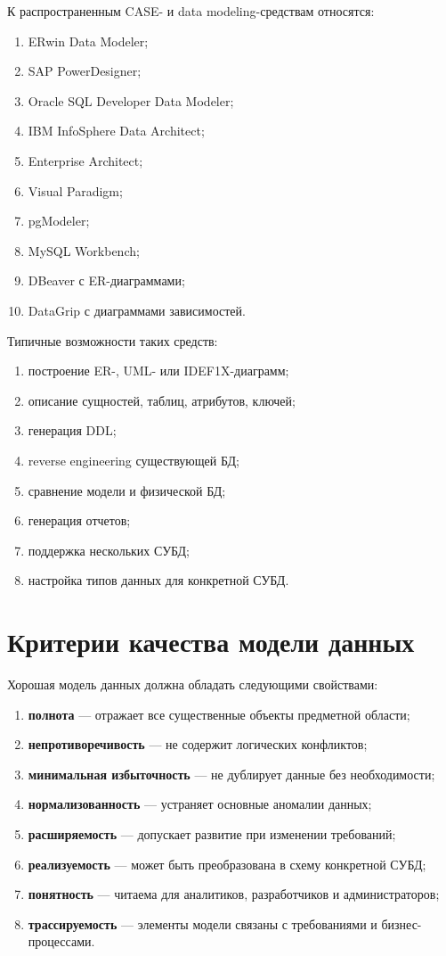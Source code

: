 \documentclass[12pt,a4paper]{article}
\theoremstyle{remark}
\begin{document}
К распространенным CASE- и data modeling-средствам относятся:

\begin{enumerate}
    \item ERwin Data Modeler;
    \item SAP PowerDesigner;
    \item Oracle SQL Developer Data Modeler;
    \item IBM InfoSphere Data Architect;
    \item Enterprise Architect;
    \item Visual Paradigm;
    \item pgModeler;
    \item MySQL Workbench;
    \item DBeaver с ER-диаграммами;
    \item DataGrip с диаграммами зависимостей.
\end{enumerate}

Типичные возможности таких средств:

\begin{enumerate}
    \item построение ER-, UML- или IDEF1X-диаграмм;
    \item описание сущностей, таблиц, атрибутов, ключей;
    \item генерация DDL;
    \item reverse engineering существующей БД;
    \item сравнение модели и физической БД;
    \item генерация отчетов;
    \item поддержка нескольких СУБД;
    \item настройка типов данных для конкретной СУБД.
\end{enumerate}

\section{Критерии качества модели данных}

Хорошая модель данных должна обладать следующими свойствами:

\begin{enumerate}
    \item \textbf{полнота} --- отражает все существенные объекты предметной области;
    \item \textbf{непротиворечивость} --- не содержит логических конфликтов;
    \item \textbf{минимальная избыточность} --- не дублирует данные без необходимости;
    \item \textbf{нормализованность} --- устраняет основные аномалии данных;
    \item \textbf{расширяемость} --- допускает развитие при изменении требований;
    \item \textbf{реализуемость} --- может быть преобразована в схему конкретной СУБД;
    \item \textbf{понятность} --- читаема для аналитиков, разработчиков и администраторов;
    \item \textbf{трассируемость} --- элементы модели связаны с требованиями и бизнес-процессами.
\end{enumerate}
\end{document}
